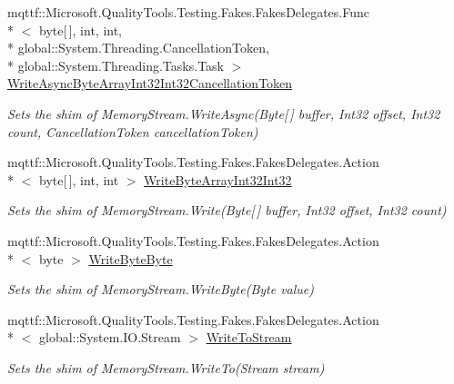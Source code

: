 \begin{DoxyCompactItemize}
mqttf\-::\-Microsoft.\-Quality\-Tools.\-Testing.\-Fakes.\-Fakes\-Delegates.\-Func\\*
$<$ byte\mbox{[}$\,$\mbox{]}, int, int, \\*
global\-::\-System.\-Threading.\-Cancellation\-Token, \\*
global\-::\-System.\-Threading.\-Tasks.\-Task $>$ \hyperlink{class_system_1_1_i_o_1_1_fakes_1_1_shim_memory_stream_aa9d87d964f70fb74647a57c40b4d8977}{Write\-Async\-Byte\-Array\-Int32\-Int32\-Cancellation\-Token}
\begin{DoxyCompactList}\small\item\em Sets the shim of Memory\-Stream.\-Write\-Async(\-Byte\mbox{[}$\,$\mbox{]} buffer, Int32 offset, Int32 count, Cancellation\-Token cancellation\-Token)\end{DoxyCompactList}\item 
mqttf\-::\-Microsoft.\-Quality\-Tools.\-Testing.\-Fakes.\-Fakes\-Delegates.\-Action\\*
$<$ byte\mbox{[}$\,$\mbox{]}, int, int $>$ \hyperlink{class_system_1_1_i_o_1_1_fakes_1_1_shim_memory_stream_ad3d26153bb0d3d3099f9417c183070e3}{Write\-Byte\-Array\-Int32\-Int32}
\begin{DoxyCompactList}\small\item\em Sets the shim of Memory\-Stream.\-Write(\-Byte\mbox{[}$\,$\mbox{]} buffer, Int32 offset, Int32 count)\end{DoxyCompactList}\item 
mqttf\-::\-Microsoft.\-Quality\-Tools.\-Testing.\-Fakes.\-Fakes\-Delegates.\-Action\\*
$<$ byte $>$ \hyperlink{class_system_1_1_i_o_1_1_fakes_1_1_shim_memory_stream_aa70f0446d11a0d92f72f33d52dc60bec}{Write\-Byte\-Byte}
\begin{DoxyCompactList}\small\item\em Sets the shim of Memory\-Stream.\-Write\-Byte(\-Byte value)\end{DoxyCompactList}\item 
mqttf\-::\-Microsoft.\-Quality\-Tools.\-Testing.\-Fakes.\-Fakes\-Delegates.\-Action\\*
$<$ global\-::\-System.\-I\-O.\-Stream $>$ \hyperlink{class_system_1_1_i_o_1_1_fakes_1_1_shim_memory_stream_a0f8c9678be4ffed1e7dfdb0d82804b43}{Write\-To\-Stream}
\begin{DoxyCompactList}\small\item\em Sets the shim of Memory\-Stream.\-Write\-To(\-Stream stream)\end{DoxyCompactList}\end{DoxyCompactItemize}


